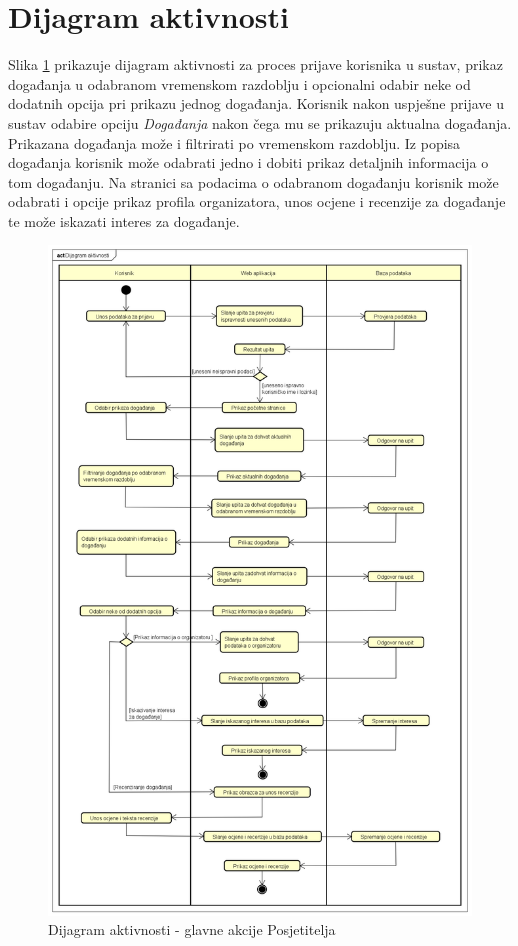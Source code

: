 			\eject 
		
		\section{Dijagram aktivnosti}
			
			
			 Slika \ref{ad} prikazuje dijagram aktivnosti za proces prijave korisnika u sustav, prikaz događanja u odabranom vremenskom razdoblju i opcionalni odabir neke od dodatnih opcija pri prikazu jednog događanja. Korisnik nakon uspješne prijave u sustav odabire opciju \textit{Događanja} nakon čega mu se prikazuju aktualna događanja. Prikazana događanja može i filtrirati po vremenskom razdoblju. Iz popisa događanja korisnik može odabrati jedno i dobiti prikaz detaljnih informacija o tom događanju. Na stranici sa podacima o odabranom događanju korisnik može odabrati i opcije prikaz profila organizatora, unos ocjene i recenzije za događanje te može iskazati interes za događanje. 
			 
			 \begin{figure}[H]
			 	\vspace{-0.8cm}
			 	\includegraphics[width=\textwidth]{dijagrami/ad.png} 
			 	\centering
			 	\vspace{-1cm}
			 	\caption{Dijagram aktivnosti - glavne akcije Posjetitelja}
			 	\label{ad}
			 \end{figure}
			
